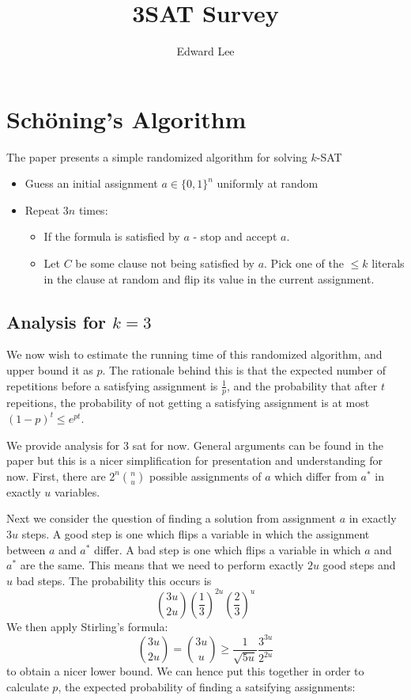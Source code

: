 \documentclass[12pt, a4paper]{article}
\title{3SAT Survey}
\author{Edward Lee}
\theoremstyle{definition}
\begin{document}
\maketitle

\section{Sch\"{o}ning's Algorithm}


The paper \cite{schoning99a-probabilistic} presents a simple randomized algorithm for solving $k$-SAT

\begin{itemize}
	\item Guess an initial assignment $a \in \{0,1\}^n$ uniformly at random
	\item Repeat $3n$ times: 
	\begin{itemize}
		\item If the formula is satisfied by $a$ - stop and accept $a$.
		\item Let $C$ be some clause not being satisfied by $a$. Pick one of the $\leq k$ literals in the clause at random and flip its value in the current assignment.
	\end{itemize}
\end{itemize}

\subsection{Analysis for $k = 3$}

We now wish to estimate the running time of this randomized algorithm, and upper bound it as $p$. The rationale behind this is that the expected number of repetitions before a satisfying assignment is $\frac{1}{p}$, and the probability that after $t$ repeitions, the probability of not getting a satisfying assignment is at most $(1-p)^t \leq e^{pt}$.

We provide analysis for 3 sat for now. General arguments can be found in the paper but this is a nicer simplification for presentation and understanding for now. First, there are $2^n \binom{n}{u}$ possible assignments of $a$ which differ from $a^*$ in exactly $u$ variables.

Next we consider the question of finding a solution from assignment $a$ in exactly $3u$ steps. 
A good step is one which flips a variable in which the assignment between $a$ and $a^*$ differ. A bad step is one which flips a variable in which $a$ and $a^*$ are the same. This means that we need to perform exactly $2u$ good steps and $u$ bad steps. The probability this occurs is
\[
	\binom{3u}{2u} \left(\frac{1}{3}\right)^{2u} \left( \frac{2}{3}\right)^{u}
\]
We then apply Stirling's formula:
\[
	\binom{3u}{2u} = \binom{3u}{u} \geq \frac{1}{\sqrt{5u}} \frac{3^{3u}}{2^{2u}}
\]
to obtain a nicer lower bound. We can hence put this together in order to calculate $p$, the expected probability of finding a satsifying assignments:
\end{document}
